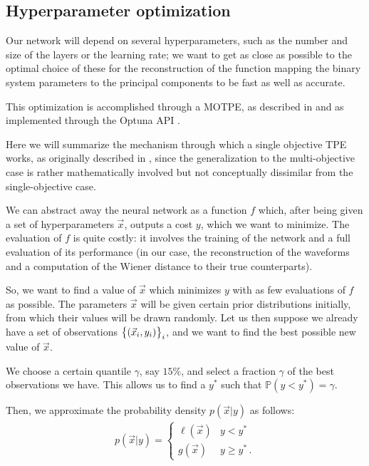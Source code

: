 \documentclass[main.tex]{subfiles}
\begin{document}
\subsection{Hyperparameter optimization}

Our network will depend on several hyperparameters, such as the number and size of the layers or the learning rate; we want to get as close as possible to the optimal choice of these for the reconstruction of the function mapping the binary system parameters to the principal components to be fast as well as accurate.

This optimization is accomplished through a \ac{MOTPE}, as described in \textcite[]{ozakiMultiobjectiveTreestructuredParzen2020} and as implemented through the Optuna API \cite[]{akibaOptunaNextgenerationHyperparameter2019}.

Here we will summarize the mechanism through which a single objective \ac{TPE} works, as originally described in \textcite[section 4]{bergstraAlgorithmsHyperParameterOptimization2011}, since
the generalization to the multi-objective case \cite[]{ozakiMultiobjectiveTreestructuredParzen2020} is rather mathematically involved but not conceptually dissimilar from the single-objective case. 

We can abstract away the neural network as a function \(f\) which, after being given a set of hyperparameters \(\vec{x}\), outputs a cost \(y\), which we want to minimize.
The evaluation of \(f\) is quite costly: it involves the training of the network and a full evaluation of its performance (in our case, the reconstruction of the waveforms and a computation of the Wiener distance to their true counterparts).  

So, we want to find a value of \(\vec{x}\) which minimizes \(y\) with as few evaluations of \(f\) as possible. 
The parameters \(\vec{x}\) will be given certain prior distributions initially, from which their values will be drawn randomly. 
Let us then suppose we already have a set of observations \(\qty{(\vec{x}_i, y_i)}_i\), and we want to find the best possible new value of \(\vec{x}\). 

We choose a certain quantile \(\gamma\), say \(15 \%\), and select a fraction \(\gamma \) of the best observations we have. This allows us to find a \(y^{*}\) such that \(\mathbb{P}(y < y^{*}) = \gamma \).  

Then, we approximate the probability density \(p(\vec{x} | y)\) as follows: 
%
\begin{align}
p(\vec{x} | y) = 
\begin{cases}
    \ell (\vec{x}) & y < y^{*} \\
    g (\vec{x}) & y \geq y^{*} 
\,.
\end{cases}
\end{align}
%
\end{document}
